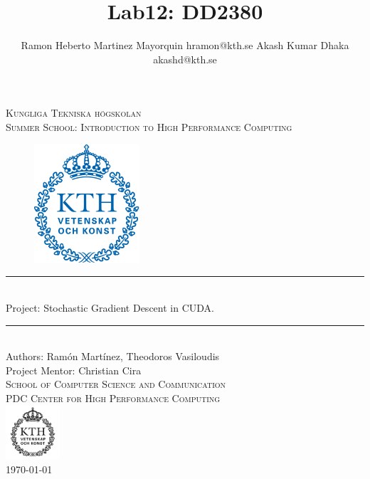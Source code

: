 \documentclass[11pt,a4paper]{article}
\title{Lab12: DD2380 }
\author{
Ramon Heberto Martinez Mayorquin  hramon@kth.se
Akash Kumar Dhaka  akashd@kth.se
}
\newcommand{\HRule}{\rule{\linewidth}{0.5mm}}
\begin{document}
\begin{titlepage}
\begin{center}

\textsc{\LARGE Kungliga Tekniska högskolan}\\[1.0cm]

\textsc{\Large Summer School: Introduction to High Performance Computing}\\[2.0cm]



\begin{figure}[H]
	\centering
 \includegraphics[width=0.35\textwidth]{Kth_logo.png}
\end{figure}
%

\HRule \\[0.4cm]
{ \huge  Project: Stochastic Gradient Descent in CUDA.
}\\[0.4cm]
\HRule \\[1.5cm]


Authors: Ram\'on  Mart\'inez, Theodoros Vasiloudis   \\
\large Project Mentor: Christian Cira  \\ [2.5cm]

\textsc{\Large School of Computer Science and Communication \\
PDC Center for High Performance Computing}\\ [1.0cm]
\includegraphics[width=0.15\textwidth]{KTH_black.png}\\[1.5cm] %
{\large \today}

\end{center}
\end{titlepage}
\end{document}
